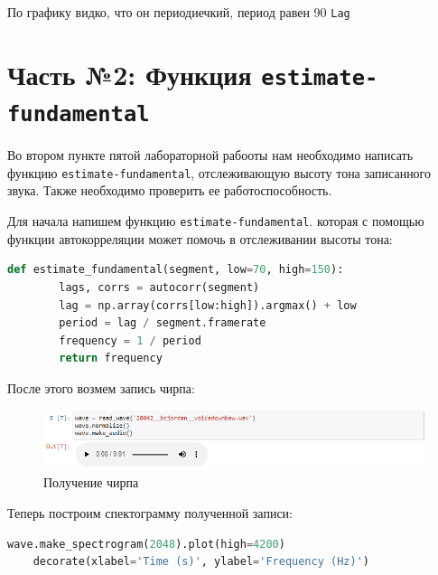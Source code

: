 \documentclass[a4paper]{article}
\begin{document}
            По графику видко, что он периодиечкий, период равен 90 \texttt{Lag}
           
    
    \newpage
        \section{Часть №2: Функция \texttt{estimate-fundamental}}
            Во втором пункте пятой лабораторной рабооты нам необходимо написать функцию \texttt{estimate-fundamental}, отслеживающую высоту тона записанного звука. Также необходимо проверить ее работоспособность.
            
            Для начала напишем функцию \texttt{estimate-fundamental}. которая с помощью функции автокорреляции может помочь в отслеживании высоты тона:
            
\begin{lstlisting}[language=Python, caption= Функция \texttt{estimate-fundamental}]
    def estimate_fundamental(segment, low=70, high=150):
        lags, corrs = autocorr(segment)
        lag = np.array(corrs[low:high]).argmax() + low
        period = lag / segment.framerate
        frequency = 1 / period
        return frequency
\end{lstlisting}
            
            После этого возмем запись чирпа:
            
            \begin{figure}[H]
                \centering
                \includegraphics[width=\textwidth]{ex_2_audio.png}
                \caption{Получение чирпа}
                \label{fig:ex_2_audio}
            \end{figure}
            
            Теперь построим спектограмму полученной записи:
            
\begin{lstlisting}[language=Python, caption= Построение спектограммы]
    wave.make_spectrogram(2048).plot(high=4200)
    decorate(xlabel='Time (s)', ylabel='Frequency (Hz)')
\end{lstlisting}               
            
\end{document}

